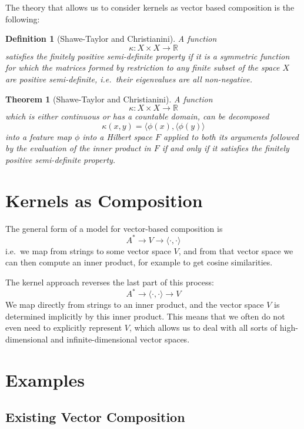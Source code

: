 \documentclass{article}
\newtheorem{definition}{Definition}
\newtheorem{theorem}{Theorem}
\begin{document}
The theory that allows us to consider kernels as vector based
composition is the following:

\begin{definition}[Shawe-Taylor and Christianini]
A function
$$\kappa : X \times X \longrightarrow \mathbb{R}$$
satisfies the finitely positive semi-definite property if it is a
symmetric function for which the matrices formed by restriction to any
finite subset of the space $X$ are positive semi-definite, i.e.~their
eigenvalues are all non-negative.
\end{definition}

\begin{theorem}[Shawe-Taylor and Christianini]
A function
$$\kappa : X \times X \longrightarrow \mathbb{R}$$
which is either continuous or has a countable domain, can be
decomposed
$$\kappa(x, y) = \langle\phi(x), \langle\phi(y)\rangle$$
into a feature map $\phi$ into a Hilbert space $F$ applied to both its
arguments followed by the evaluation of the inner product in $F$ if
and only if it satisfies the finitely positive semi-definite
property.
\end{theorem}

\section{Kernels as Composition}

The general form of a model for vector-based composition is
$$A^* \longrightarrow V \longrightarrow \langle \cdot,\cdot\rangle$$
i.e.~we map from strings to some vector space $V$, and from that
vector space we can then compute an inner product, for example to get
cosine similarities.

The kernel approach reverses the last part of this process:
$$A^* \longrightarrow \langle \cdot,\cdot\rangle \longrightarrow V$$
We map directly from strings to an inner product, and the vector space
$V$ is determined implicitly by this inner product. This means that we
often do not even need to explicitly represent $V$, which allows us to
deal with all sorts of high-dimensional and infinite-dimensional
vector spaces.

\section{Examples}

\subsection{Existing Vector Composition}
\end{document}
